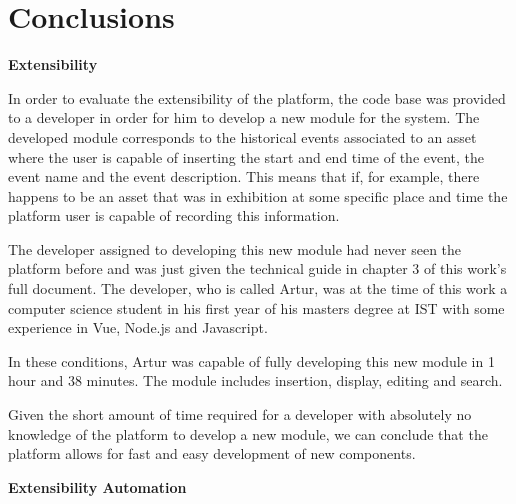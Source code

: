 
\section{Conclusions}

\vspace{4mm}
\textbf{Extensibility}
\vspace{2mm}

In order to evaluate the extensibility of the platform, the code base was provided to a developer in order for him to develop a new module for the system. The developed module corresponds to the historical events associated to an asset where the user is capable of inserting the start and end time of the event, the event name and the event description. This means that if, for example, there happens to be an asset that was in exhibition at some specific place and time the platform user is capable of recording this information.

The developer assigned to developing this new module had never seen the platform before and was just given the technical guide in chapter 3 of this work's full document. The developer, who is called Artur, was at the time of this work a computer science student in his first year of his masters degree at IST with some experience in Vue, Node.js and Javascript.

In these conditions, Artur was capable of fully developing this new module in 1 hour and 38 minutes. The module includes insertion, display, editing and search.

Given the short amount of time required for a developer with absolutely no knowledge of the platform to develop a new module, we can conclude that the platform allows for fast and easy development of new components.

\vspace{4mm}
\textbf{Extensibility Automation}
\vspace{2mm}

